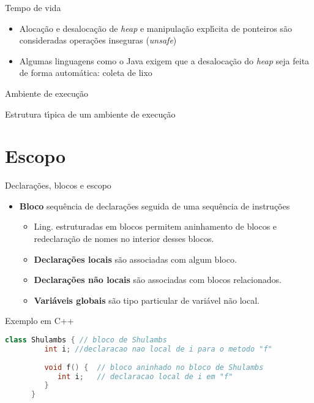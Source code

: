 \documentclass[handout,aspectratio=169]{beamer}
\newcommand{\bi}{\begin{itemize}[<+->]}
\newcommand{\ei}{\end{itemize}}
\begin{document}
\begin{frame}{Tempo de vida}
		\bi
				\item Aloca\c{c}\~{a}o e desaloca\c{c}\~{a}o de \textit{heap} e manipula\c{c}\~{a}o expl\'{\i}cita de ponteiros s\~{a}o consideradas opera\c{c}\~{o}es inseguras (\textit{unsafe})
				\item Algumas linguagens como o Java exigem que a desaloca\c{c}\~{a}o do \textit{heap} seja feita de forma autom\'{a}tica: coleta de lixo
		\ei
\end{frame}


\begin{frame}[fragile]{Ambiente de execu\c{c}\~{a}o}
	
		\begin{block}{Estrutura t\'{\i}pica de um ambiente de execu\c{c}\~{a}o}
		\centering
    \end{block}	

\end{frame}


\section{Escopo}

\begin{frame}[fragile]{Declara\c{c}\~{o}es, blocos e escopo}
\bi
	\item \textbf{Bloco} sequ\^{e}ncia de declara\c{c}\~{o}es seguida de uma sequ\^{e}ncia de instru\c{c}\~{o}es
	\bi
		\item Ling. estruturadas em blocos permitem aninhamento de blocos e redeclara\c{c}\~{a}o de nomes no interior desses blocos.
      	\item \textbf{Declara\c{c}\~{o}es locais} s\~{a}o associadas com algum bloco.
		\item \textbf{Declara\c{c}\~{o}es n\~{a}o locais} s\~{a}o associadas com blocos relacionados.
		\item \textbf{Vari\'{a}veis globais} s\~{a}o tipo particular de vari\'{a}vel n\~{a}o local.
	\ei
\ei

	\begin{block}{Exemplo em C++}
	\begin{lstlisting}[language=c++,numbers=none, basicstyle=\tiny]
      class Shulambs { // bloco de Shulambs
         int i; //declaracao nao local de i para o metodo "f"
         
         void f() {  // bloco aninhado no bloco de Shulambs
            int i;   // declaracao local de i em "f"
         }
      }
	\end{lstlisting}
\end{block}	

\end{frame}
\end{document}
